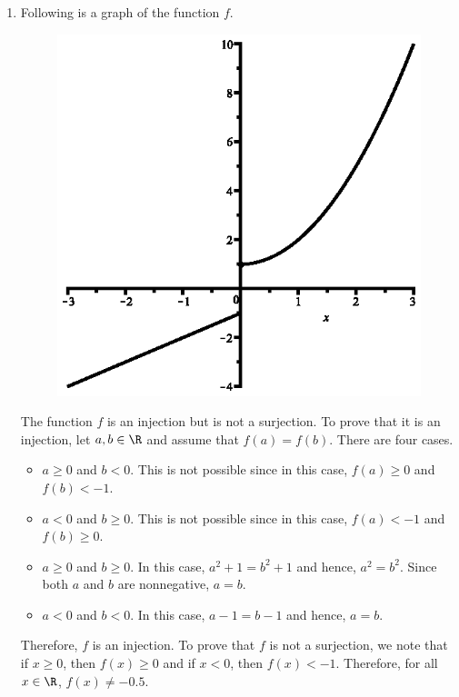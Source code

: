 \documentclass[11pt]{article}
\begin{document}
\begin{enumerate}
\item Following is a graph of the function $f$.  
\begin{figure}[h]
\begin{center}
\includegraphics{fig-sec63-exer18.eps}
\end{center}
\end{figure}

\newpar
The function $f$ is an injection but is not a surjection.  To prove that it is an injection, let $a, b \in \R$ and assume that $f(a) = f(b)$.  There are four cases.
\begin{itemize}
\item $a \geq 0$ and $b < 0$.  This is not possible since in this case, $f(a) \geq 0$ and 
$f(b) < -1$.
\item $a < 0$ and $b \geq 0$.  This is not possible since in this case, $f(a) < -1$ and 
$f(b) \geq 0$.
\item $a \geq 0$ and $b \geq 0$.  In this case, $a^2 + 1 = b^2 + 1$ and hence, $a^2 = b^2$.  Since both $a$ and $b$ are nonnegative, $a = b$.
\item $a < 0$ and $b < 0$.  In this case, $a - 1 = b - 1$ and hence, $a = b$.
\end{itemize}
Therefore, $f$ is an injection.  To prove that $f$ is not a surjection, we note that if 
$x \geq 0$, then $f(x) \geq 0$ and if $x < 0$, then $f(x) < -1$.  Therefore, for all 
$x \in \R$, $f(x) \ne -0.5$.


\end{enumerate}
\end{document}
